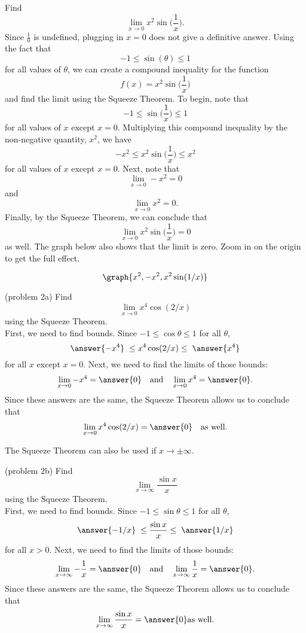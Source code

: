 \documentclass[handout]{ximera}
\begin{document}
\begin{example}[example 2]
Find
\[
\lim_{x\to 0} x^2 \sin\Big(\frac{1}{x}\Big).
\]
Since $\frac{1}{0}$ is undefined, plugging in $x=0$
does not give a definitive answer.
Using the fact that 
\[
-1 \leq \sin(\theta) \leq 1
\]
for all values of $\theta$, we can create a compound inequality for
the function
\[
f(x) = x^2 \sin\Big(\frac{1}{x}\Big)
\]
and find the limit using the Squeeze Theorem.
To begin, note that
\[
-1 \leq \sin\Big(\frac{1}{x}\Big) \leq 1
\]
for all values of $x$ except $x=0$.
Multiplying this compound inequality by the non-negative quantity, $x^2$,
we have
\[
-x^2 \leq x^2\sin\Big(\frac{1}{x}\Big) \leq x^2
\]
for all values of $x$ except $x=0$.
Next, note that
\[
\lim_{x\to 0} -x^2 = 0
\]
and
\[
\lim_{x\to 0} x^2 = 0.
\]
Finally, by the Squeeze Theorem, we can conclude that
\[
\lim_{x\to 0} x^2\sin\Big(\frac{1}{x}\Big) = 0
\]
as well. The graph below also shows that the limit is zero.
Zoom in on the origin to get the full effect.

\[
\graph{x^2, -x^2, x^2 \sin(1/x)}
\]

\end{example}

\begin{problem}(problem 2a)
Find
\[
\lim_{x \to 0} x^4 \cos(2/x)
\]
using the Squeeze Theorem.\\
First, we need to find bounds. Since $-1 \leq \cos \theta \leq 1$ for all $\theta$, 
\[
\answer{-x^4} \; \leq x^4\cos(2/x) \leq \; \answer{x^4}
\]
for all $x$ except $x=0$.
Next, we need to find the limits of those bounds:
\[
\lim_{x \to 0}  - x^4 = \answer{0} \quad \text{and} \quad  \lim_{x \to 0} x^4 = \answer{0}.
\]
Since these answers are the same, the Squeeze Theorem allows us to conclude that 
\[
\lim_{x \to 0} x^4\cos(2/x) = \answer{0} \quad \text{as well}.
\]

\end{problem}

The Squeeze Theorem can also be used if $x \to \pm \infty$.

\begin{problem}(problem 2b)
Find
\[
\lim_{x \to \infty} \frac{\sin x}{x}
\]
using the Squeeze Theorem.\\
First, we need to find bounds. Since $-1 \leq \sin \theta \leq 1$ for all $\theta$, 
\[
\answer{-1/x} \; \leq \frac{\sin x}{x} \leq \;  \answer{1/x}
\]
for all $x>0$.
Next, we need to find the limits of those bounds:
\[
\lim_{x \to \infty}  -\frac{1}{x} = \answer{0} \quad \text{and} \quad \lim_{x \to \infty} \frac{1}{x} = \answer{0}.
\]
Since these answers are the same, the Squeeze Theorem allows us to conclude that 
\[
\lim_{x \to \infty} \frac{\sin x}{x} = \answer{0} \text{as well}.
\]

\end{problem}
\end{document}
